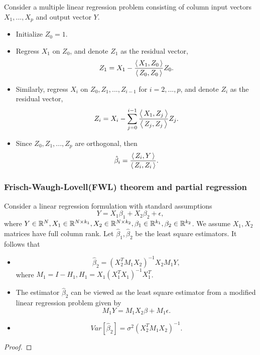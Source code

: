 \begin{refsection}
\begin{method}
Consider a multiple linear regression problem consisting of column input vectors $X_1,...,X_p$ and output vector $Y$.	
\begin{itemize}
	\item Initialize $Z_0 = 1$.
	\item Regress $X_1$ on $Z_0$, and denote $Z_1$ as the residual vector,
	$$Z_1 = X_1 - \frac{{\left< \, X_1,Z_0 \, \right>}}{{\left< \, Z_0,Z_0 \, \right>}}Z_0.$$
	\item Similarly, regress $X_i$ on $Z_0,Z_1,...,Z_{i-1}$ for $i=2,...,p$, and denote $Z_i$ as the residual vector,
	$$Z_i = X_i - \sum_{j=0}^{i-1}\frac{{\left< \, X_1,Z_j \, \right>}}{{\left< \, Z_j,Z_j \, \right>}}Z_j.$$
	
	\item Since $Z_0,Z_1,...,Z_p$ are orthogonal, then 
	$$\hat{\beta}_i =  \frac{ {\left< \, Z_i,Y \, \right>}}{{\left< \, Z_i,Z_i \, \right>}}.$$
\end{itemize}
\end{method}


\subsubsection{Frisch-Waugh-Lovell(FWL) theorem and partial regression}


\begin{theorem}\label{ch:regression-analysis:th:LinearRegressionPartialRegressionFrisch-Waugh-LovellTheorem}
Consider a linear regression formulation with standard assumptions
$$Y = X_1\beta_1 + X_2\beta_2 + \epsilon,$$
where $Y\in \mathbb{R}^N, X_1\in \mathbb{R}^{N\times k_1}, X_2\in \mathbb{R}^{N\times k_2}, \beta_1\in\mathbb{R}^{k_1}, \beta_2\in \mathbb{R}^{k_2}$. We assume $X_1,X_2$ matrices have full column rank. Let $\hat{\beta}_1,\hat{\beta}_2$ be the least square estimators.
It follows that
\begin{itemize}
	\item $$\hat{\beta}_2 = (X_2^TM_1X_2)^{-1}X_2M_1Y,$$
	where $M_1 = I - H_1, H_1 = X_1(X_1^TX_1)^{-1}X_1^T$.
	\item The estimator $\hat{\beta}_2$ can be viewed as the least square estimator from a modified linear regression problem given by
	$$M_1Y = M_1X_2 \beta + M_1\epsilon.$$
	\item $$Var[\hat{\beta}_2] = \sigma^2 (X_2^TM_1X_2)^{-1}. $$
\end{itemize}	
\end{theorem}
\begin{proof}


\end{proof}
\end{refsection}
